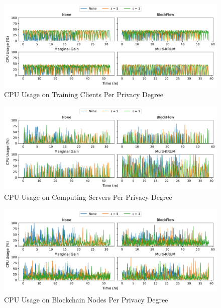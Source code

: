 \clearpage

\begin{figure}[!h]
    \centering
    \includegraphics[width=\textwidth]{graphics/privacy/cpu_client.pdf}
    \caption{CPU Usage on Training Clients Per Privacy Degree}
    \label{fig:cpu_privacy_clients}
\end{figure}

\vfill

\begin{figure}[!h]
    \centering
    \includegraphics[width=\textwidth]{graphics/privacy/cpu_server.pdf}
    \caption{CPU Usage on Computing Servers Per Privacy Degree}
    \label{fig:cpu_privacy_servers}
\end{figure}

\vfill

\begin{figure}[!h]
    \centering
    \includegraphics[width=\textwidth]{graphics/privacy/cpu_miner.pdf}
    \caption{CPU Usage on Blockchain Nodes Per Privacy Degree}
    \label{fig:cpu_privacy_miners}
\end{figure}

